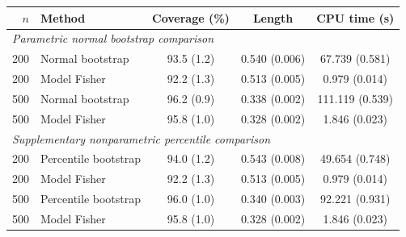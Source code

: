 \begin{tabular}{rlccc}
\toprule
$n$ & Method & Coverage (\%) & Length & CPU time (s)\\
\midrule
\multicolumn{5}{l}{\textit{Parametric normal bootstrap comparison}}\\
200 & Normal bootstrap & 93.5 (1.2) & 0.540 (0.006) & 67.739 (0.581)\\
200 & Model Fisher & 92.2 (1.3) & 0.513 (0.005) & 0.979 (0.014)\\
500 & Normal bootstrap & 96.2 (0.9) & 0.338 (0.002) & 111.119 (0.539)\\
500 & Model Fisher & 95.8 (1.0) & 0.328 (0.002) & 1.846 (0.023)\\
\midrule
\multicolumn{5}{l}{\textit{Supplementary nonparametric percentile comparison}}\\
200 & Percentile bootstrap & 94.0 (1.2) & 0.543 (0.008) & 49.654 (0.748)\\
200 & Model Fisher & 92.2 (1.3) & 0.513 (0.005) & 0.979 (0.014)\\
500 & Percentile bootstrap & 96.0 (1.0) & 0.340 (0.003) & 92.221 (0.931)\\
500 & Model Fisher & 95.8 (1.0) & 0.328 (0.002) & 1.846 (0.023)\\
\bottomrule
\end{tabular}
